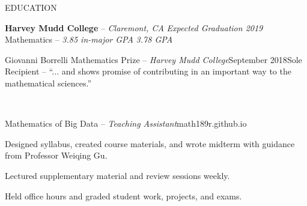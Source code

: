 \documentclass{resume} %
\begin{document}
\begin{rSection}{EDUCATION}

{{\bf Harvey Mudd College} -- {\it Claremont, CA}} \hfill {\em Expected Graduation 2019} \\ 
Mathematics -- {\em 3.85 in-major GPA} \hfill {\em 3.78 GPA}\\[-1.25em]

\begin{rSubsection}{Giovanni Borrelli Mathematics Prize -- {\it Harvey Mudd College}}{September 2018}{Sole Recipient -- ``... and shows promise of contributing in an important way to the mathematical sciences.''}
\item\quad\\[-3.25em]
\end{rSubsection}

\begin{rSubsection}{Mathematics of Big Data -- {\it Teaching Assistant}}{\textsf{math189r.github.io}}{}

\item Designed syllabus, created course materials, and wrote midterm with guidance from Professor Weiqing Gu.
\item Lectured supplementary material and review sessions weekly.
\item Held office hours and graded student work, projects, and exams.
\end{rSubsection}
\end{rSection}
\end{document}
